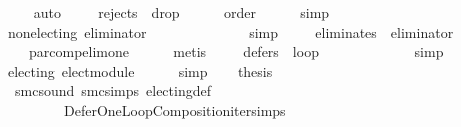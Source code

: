 \begin{isabellebody}
\ \ \ \ \isamarkupfalse%
\ auto\isanewline
\ \ \isamarkupfalse%
\ {}{}{}{\isacharcolon}{\kern0pt}\ {\isachardoublequoteopen}rejects\ {}\ {\isacharquery}{\kern0pt}drop{}{\isachardoublequoteclose}\isanewline
\ \ \ \ \isamarkupfalse%
\ order\isanewline
\ \ \ \ \isamarkupfalse%
\ simp\isanewline
\isanewline
\ \ \isamarkupfalse%
\ {}{}{\isacharcolon}{\kern0pt}\ {\isachardoublequoteopen}non{\isacharunderscore}{\kern0pt}electing\ {\isacharquery}{\kern0pt}eliminator{\isachardoublequoteclose}\isanewline
\ \ \ \ \isamarkupfalse%
\ {}{}{}\ {}{}{}\ {}{}{}\isanewline
\ \ \ \ \isamarkupfalse%
\ simp\isanewline
\ \ \isamarkupfalse%
\ {}{}{\isacharcolon}{\kern0pt}\ {\isachardoublequoteopen}eliminates\ {}\ {\isacharquery}{\kern0pt}eliminator{\isachardoublequoteclose}\isanewline
\ \ \ \ \isamarkupfalse%
\ {}{}{}\ {}{}{}\ {}{}{}\ {}{}{}\ par{\isacharunderscore}{\kern0pt}comp{\isacharunderscore}{\kern0pt}elim{\isacharunderscore}{\kern0pt}one\isanewline
\ \ \ \ \isamarkupfalse%
\ metis\isanewline
\isanewline
\ \ \isamarkupfalse%
\ {}{\isacharcolon}{\kern0pt}\ {\isachardoublequoteopen}defers\ {}\ {\isacharquery}{\kern0pt}loop{\isachardoublequoteclose}\isanewline
\ \ \ \ \isamarkupfalse%
\ {}{}\ {}{}\isanewline
\ \ \ \ \isamarkupfalse%
\ simp\isanewline
\ \ \isamarkupfalse%
\ {}{\isacharcolon}{\kern0pt}\ {\isachardoublequoteopen}electing\ elect{\isacharunderscore}{\kern0pt}module{\isachardoublequoteclose}\isanewline
\ \ \ \ \isamarkupfalse%
\ simp\isanewline
\isanewline
\ \ \isamarkupfalse%
\ {\isacharquery}{\kern0pt}thesis\isanewline
\ \ \ \ \isamarkupfalse%
\ {}\ {}\ smc{\isacharunderscore}{\kern0pt}sound\ smc{\isachardot}{\kern0pt}simps\ electing{\isacharunderscore}{\kern0pt}def\isanewline
\ \ \ \ \ \ \ \ \ \ Defer{\isacharunderscore}{\kern0pt}One{\isacharunderscore}{\kern0pt}Loop{\isacharunderscore}{\kern0pt}Composition{\isachardot}{\kern0pt}iter{\isachardot}{\kern0pt}simps\isanewline

\end{isabellebody}
